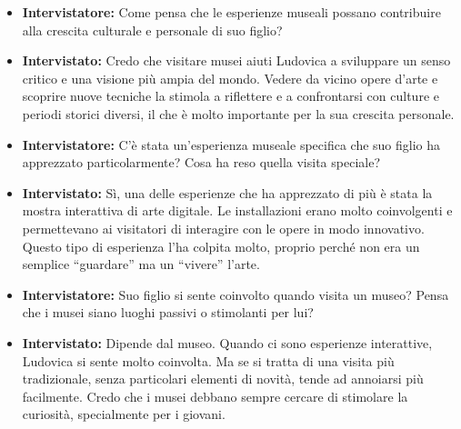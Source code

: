 \documentclass{article}
\begin{document}
\begin{itemize}
    \item \textbf{Intervistatore:} Come pensa che le esperienze museali possano contribuire alla crescita culturale e personale di suo figlio?
    \item \textbf{Intervistato:} Credo che visitare musei aiuti Ludovica a sviluppare un senso critico e una visione più ampia del mondo. Vedere da vicino opere d’arte e scoprire nuove tecniche la stimola a riflettere e a confrontarsi con culture e periodi storici diversi, il che è molto importante per la sua crescita personale.
    
    \item \textbf{Intervistatore:} C'è stata un’esperienza museale specifica che suo figlio ha apprezzato particolarmente? Cosa ha reso quella visita speciale?
    \item \textbf{Intervistato:} Sì, una delle esperienze che ha apprezzato di più è stata la mostra interattiva di arte digitale. Le installazioni erano molto coinvolgenti e permettevano ai visitatori di interagire con le opere in modo innovativo. Questo tipo di esperienza l’ha colpita molto, proprio perché non era un semplice “guardare” ma un “vivere” l’arte.
    
    \item \textbf{Intervistatore:} Suo figlio si sente coinvolto quando visita un museo? Pensa che i musei siano luoghi passivi o stimolanti per lui?
    \item \textbf{Intervistato:} Dipende dal museo. Quando ci sono esperienze interattive, Ludovica si sente molto coinvolta. Ma se si tratta di una visita più tradizionale, senza particolari elementi di novità, tende ad annoiarsi più facilmente. Credo che i musei debbano sempre cercare di stimolare la curiosità, specialmente per i giovani.
\end{itemize}
\end{document}
